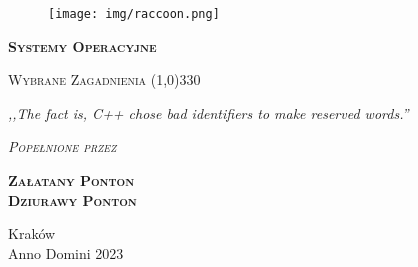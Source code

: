 \begin{titlepage}
	\begin{center}
		\begin{figure}[h]
			\centering
			\texttt{[image: img/raccoon.png]}
		\end{figure}

		\Huge
		\textbf{\textsc{Systemy Operacyjne}}

		\vspace{0.5cm}
		\Large
		\textsc{Wybrane Zagadnienia}
		\line(1,0){330}

		\normalsize

		\vspace{1cm}
		\textit{,,The fact is, C++ chose bad identifiers to make reserved words.''}
		\vspace{1cm}

		\textit{\textsc{Popełnione przez}}\\
		\vspace{5mm}

		\textbf{\textsc{Załatany Ponton \\ Dziurawy Ponton}}

		\vfill

		Kraków \\
		Anno Domini 2023
	\end{center}
\end{titlepage}